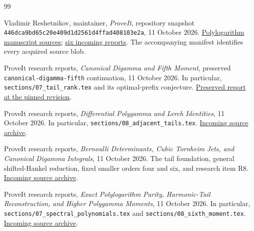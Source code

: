 \documentclass[11pt]{article}
\theoremstyle{definition}
\theoremstyle{remark}
\numberwithin{equation}{section}
\begin{document}
\begin{thebibliography}{99}
\raggedright
{}

Vladimir Reshetnikov, maintainer,
\emph{ProveIt}, repository snapshot
\texttt{446dca9bd65c20e409d1d2561d4ffad408103e2a},
11 October 2026.
\href{https://github.com/VladimirReshetnikov/ProveIt/tree/446dca9bd65c20e409d1d2561d4ffad408103e2a/Analysis/Polylogarithms/docs/manuscript}{Polylogarithm manuscript sources};
\href{https://github.com/VladimirReshetnikov/ProveIt/tree/446dca9bd65c20e409d1d2561d4ffad408103e2a/docs/incoming}{six incoming reports}.
The accompanying manifest identifies every acquired source blob.

ProveIt research reports,
\emph{Canonical Digamma and Fifth Moment},
preserved \texttt{canonical-digamma-fifth} continuation,
11 October 2026. In particular,
\texttt{sections/07\_tail\_rank.tex} and its optimal-prefix conjecture.
\href{https://github.com/VladimirReshetnikov/ProveIt/tree/446dca9bd65c20e409d1d2561d4ffad408103e2a/Analysis/Polylogarithms/docs/reports/stieltjes-harmonic-resonance/continuations/canonical-digamma-fifth}{Preserved report at the pinned revision}.

ProveIt research reports,
\emph{Differential Polygamma and Lerch Identities},
11 October 2026. In particular,
\texttt{sections/08\_adjacent\_tails.tex}.
\href{https://github.com/VladimirReshetnikov/ProveIt/blob/446dca9bd65c20e409d1d2561d4ffad408103e2a/docs/incoming/ProveIt_Differential_Polygamma_and_Lerch_Jets_2026-10-11.zip}{Incoming source archive}.

ProveIt research reports,
\emph{Bernoulli Determinants, Cubic Tornheim Jets, and Canonical
Digamma Integrals}, 11 October 2026.
The tail foundation, general shifted-Hankel reduction,
fixed smaller orders four and six, and research item R8.
\href{https://github.com/VladimirReshetnikov/ProveIt/blob/446dca9bd65c20e409d1d2561d4ffad408103e2a/docs/incoming/ProveIt_Bernoulli_Tornheim_Digamma_2026-10-11.zip}{Incoming source archive}.

ProveIt research reports,
\emph{Exact Polylogarithm Parity, Harmonic-Tail Reconstruction,
and Higher Polygamma Moments}, 11 October 2026.
In particular, \texttt{sections/07\_spectral\_polynomials.tex}
and \texttt{sections/08\_sixth\_moment.tex}.
\href{https://github.com/VladimirReshetnikov/ProveIt/blob/446dca9bd65c20e409d1d2561d4ffad408103e2a/docs/incoming/ProveIt_Polygamma_Tail_Identities_2026-10-11.zip}{Incoming source archive}.


\end{thebibliography}
\end{document}
